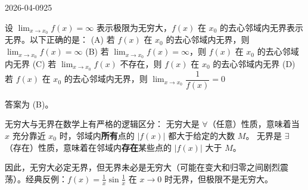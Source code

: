 \begin{mistake}{2026-04-09}{25}

\begin{problemcontent}
设 \( \lim_{x \to x_0} f(x) = \infty \) 表示极限为无穷大，\( f(x) \) 在 \( x_0 \) 的去心邻域内无界表示无界。以下正确的是：
(A) 若 \( f(x) \) 在 \( x_0 \) 的去心邻域内无界，则 \( \lim_{x \to x_0} f(x) = \infty \)
(B) 若 \( \lim_{x \to x_0} f(x) = \infty \)，则 \( f(x) \) 在 \( x_0 \) 的去心邻域内无界
(C) 若 \( \lim_{x \to x_0} f(x) \) 不存在，则 \( f(x) \) 在 \( x_0 \) 的去心邻域内无界
(D) 若 \( f(x) \) 在 \( x_0 \) 的去心邻域内无界，则 \( \lim_{x \to x_0} \dfrac{1}{f(x)} = 0 \)
\end{problemcontent}

\begin{solutioncontent}
答案为 (B)。

无穷大与无界在数学上有严格的逻辑区分：
无穷大是 \( \forall \)（任意）性质，意味着当 \( x \) 充分靠近 \( x_0 \) 时，邻域内\textbf{所有}点的 \( |f(x)| \) 都大于给定的大数 \( M \)。
无界是 \( \exists \)（存在）性质，意味着在邻域内\textbf{存在}某些点的 \( |f(x)| \) 大于 \( M \)。

因此，无穷大必定无界，但无界未必是无穷大（可能在变大和归零之间剧烈震荡）。经典反例：\( f(x) = \frac{1}{x}\sin\frac{1}{x} \) 在 \( x \to 0 \) 时无界，但极限不是无穷大。
\end{solutioncontent}


\end{mistake}
